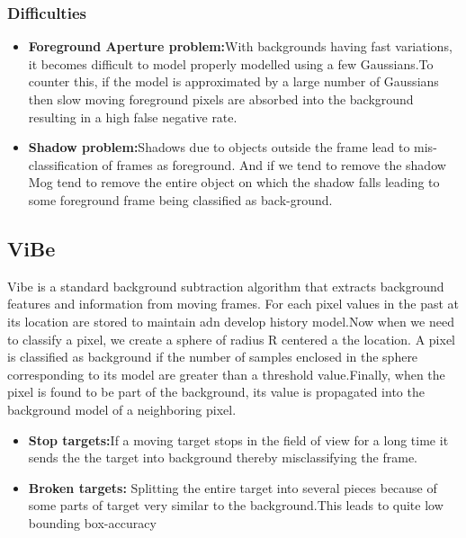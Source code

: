 \documentclass[12pt,a4paper]{report}
\begin{document}
\subsubsection{Difficulties}
\begin{itemize}
\item {\bf Foreground Aperture problem:}With backgrounds having fast variations, it becomes difficult to model properly modelled using a few Gaussians.To counter this, if the model is approximated by a large number of Gaussians then slow moving foreground pixels are absorbed into the background resulting in a high false negative rate. 
\item {\bf Shadow problem:}Shadows due to objects outside the frame lead to mis-classification of frames as foreground. And if we tend to remove the shadow Mog tend to remove the entire object on which the shadow falls leading to some foreground frame being classified as back-ground.
\end{itemize} 
\subsection*{ViBe}
Vibe is a standard background subtraction algorithm that extracts background features and information from moving frames.
For each pixel values in the past at  its location are stored to maintain adn develop  history model.Now when we need to classify a pixel, we create a sphere of radius R centered a the location. A pixel is classified as background if the number of samples enclosed in the sphere corresponding to its model are greater than a threshold value.Finally, when the pixel is found to be part of the background, its value is propagated into the background model of a neighboring pixel. 
\begin{itemize}
\item {\bf Stop targets:}If a moving target stops in the field of view for a long time it sends the the target into background thereby misclassifying the frame.
\item {\bf Broken targets:} Splitting the entire target into several pieces because of some parts of target very similar to the background.This leads to quite low bounding box-accuracy  
\end{itemize} 
\end{document}
